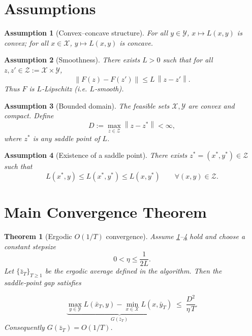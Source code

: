 \documentclass{article}
\newtheorem{theorem}{Theorem}
\newtheorem{assumption}{Assumption}
\newcommand{\norm}[1]{\left\|#1\right\|}
\begin{document}
\newpage
\section*{Assumptions}
\begin{assumption}[Convex–concave structure]\label{as:convex}
For all $y\in\mathcal Y$, $x\mapsto L(x,y)$ is convex; for all $x\in\mathcal X$,
$y\mapsto L(x,y)$ is concave.
\end{assumption}
\begin{assumption}[Smoothness]\label{as:smooth}
There exists $L>0$ such that for all $z,z'\in\mathcal Z:=\mathcal X\times\mathcal Y$,
\[
\norm{F(z)-F(z')}\le L\,\norm{z-z'} .
\tag{2}
\]
Thus $F$ is $L$‑Lipschitz (i.e. $L$‑smooth).
\end{assumption}
\begin{assumption}[Bounded domain]\label{as:bounded}
The feasible sets $\mathcal X,\mathcal Y$ are convex and compact. Define
\[
D:=\max_{z\in\mathcal Z}\norm{z-z^*}<\infty ,
\]
where $z^*$ is any saddle point of $L$.
\end{assumption}
\begin{assumption}[Existence of a saddle point]\label{as:saddle}
There exists $z^*=(x^*,y^*)\in\mathcal Z$ such that
\[
L(x^*,y)\le L(x^*,y^*)\le L(x,y^*)\qquad\forall (x,y)\in\mathcal Z .
\tag{3}
\]
\end{assumption}

\section*{Main Convergence Theorem}
\begin{theorem}[Ergodic $O(1/T)$ convergence]\label{thm:main}
Assume \ref{as:convex}–\ref{as:saddle} hold and choose a constant stepsize
\[
0<\eta\le \frac{1}{2L}.
\tag{4}
\]
Let $\{\bar z_T\}_{T\ge1}$ be the ergodic average defined in the algorithm.
Then the \emph{saddle‑point gap} satisfies  

\[
\underbrace{\max_{y\in\mathcal Y}L(\bar x_T,y)-\min_{x\in\mathcal X}L(x,\bar y_T)}_{\displaystyle G(\bar z_T)}
\;\le\;
\frac{D^{2}}{\eta\,T}.
\tag{5}
\]
Consequently $G(\bar z_T)=O(1/T)$.
\end{theorem}
\end{document}
